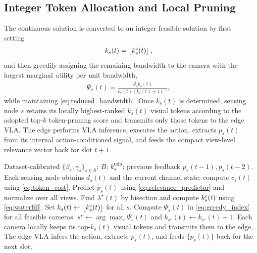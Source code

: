 \documentclass[lettersize,journal]{IEEEtran}
\theoremstyle{custom}
\begin{document}
\subsection{Integer Token Allocation and Local Pruning}
The continuous solution is converted to an integer feasible solution by first setting
\begin{align}
    k_s(t)=\left\lfloor k_s^{\rm c}(t)\right\rfloor,
\end{align}
and then greedily assigning the remaining bandwidth to the camera with the largest marginal utility per unit bandwidth,
\begin{align}\label{eq:greedy_index}
    \Psi_s(t)=
    \frac{\beta_s\widehat p_s(t)}{c_s(t)(k_s(t)+1)^{\gamma_s}},
\end{align}
while maintaining \eqref{eq:reduced_bandwidth}. Once $k_s(t)$ is determined, sensing node $s$ retains its locally highest-ranked $k_s(t)$ visual tokens according to the adopted top-$k$ token-pruning score and transmits only those tokens to the edge VLA. The edge performs VLA inference, executes the action, extracts $p_s(t)$ from its internal action-conditioned signal, and feeds the compact view-level relevance vector back for slot $t+1$.

\begin{algorithm}[t]
\caption{Delayed Action-Relevance-Aware Token Allocation}\label{alg:allocation}
\begin{algorithmic}[1]
\REQUIRE Dataset-calibrated $\{\beta_s,\gamma_s\}_{s\in\mathcal S}$; $B$; $k_s^{\min}$; previous feedback $p_s(t-1),p_s(t-2)$.
\STATE Each sensing node obtains $d_s(t)$ and the current channel state; compute $c_s(t)$ using \eqref{eq:token_cost}.
\STATE Predict $\widehat p_s(t)$ using \eqref{eq:relevance_predictor} and normalize over all views.
\STATE Find $\lambda^\star(t)$ by bisection and compute $k_s^{\rm c}(t)$ using \eqref{eq:waterfill}.
\STATE Set $k_s(t)\leftarrow\lfloor k_s^{\rm c}(t)\rfloor$ for all $s$.
    \STATE Compute $\Psi_s(t)$ in \eqref{eq:greedy_index} for all feasible cameras.
    \STATE $s^\star\leftarrow\arg\max_s\Psi_s(t)$ and $k_{s^\star}(t)\leftarrow k_{s^\star}(t)+1$.
\ENDWHILE
\STATE Each camera locally keeps its top-$k_s(t)$ visual tokens and transmits them to the edge.
\STATE The edge VLA infers the action, extracts $p_s(t)$, and feeds $\{p_s(t)\}$ back for the next slot.
\end{algorithmic}
\end{algorithm}
\end{document}
